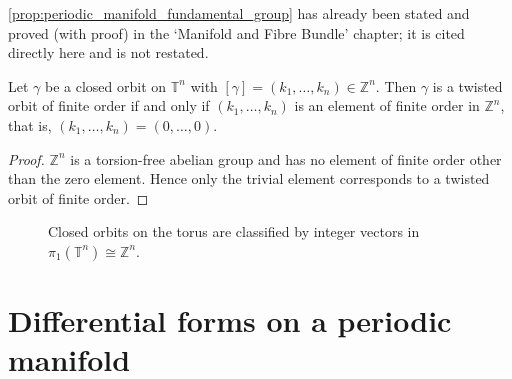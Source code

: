 \begin{remark}\label{rem:torus_fundamental_group_source}
\cref{prop:periodic_manifold_fundamental_group} has already been stated and proved (with proof) in the `Manifold and Fibre Bundle' chapter; it is cited directly here and is not restated.
\end{remark}

\begin{corollary}\label{cor:twisted_orbit}
Let $\gamma$ be a closed orbit on $\mathbb{T}^n$ with $[\gamma]=(k_1,\dots,k_n)\in\mathbb{Z}^n$. Then $\gamma$ is a twisted orbit of finite order if and only if $(k_1,\dots,k_n)$ is an element of finite order in $\mathbb{Z}^n$, that is, $(k_1,\dots,k_n)=(0,\dots,0)$.
\end{corollary}

\begin{proof}
$\mathbb{Z}^n$ is a torsion-free abelian group and has no element of finite order other than the zero element. Hence only the trivial element corresponds to a twisted orbit of finite order.
\end{proof}

\begin{figure}[htbp]
\centering
{}
\caption{Closed orbits on the torus are classified by integer vectors in $\pi_1(\mathbb{T}^n)\cong\mathbb{Z}^n$.}
\label{fig:torus_fundamental_group_periodic}
\end{figure}

\section{Differential forms on a periodic manifold}\label{sec:periodic_forms}

